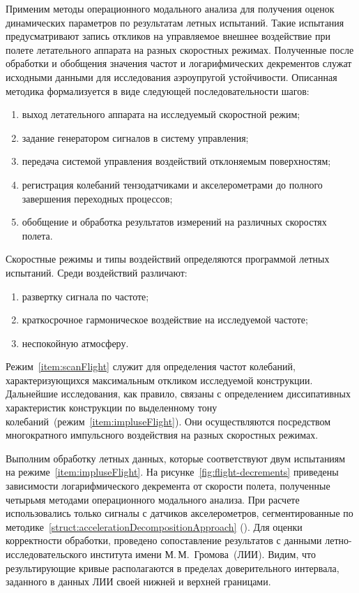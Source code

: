 Применим методы операционного модального анализа для получения оценок динамических параметров по результатам летных испытаний. Такие испытания предусматривают запись откликов на управляемое внешнее воздействие при полете летательного аппарата на разных скоростных режимах. Полученные после обработки и обобщения значения частот и логарифмических декрементов служат исходными данными для исследования аэроупругой устойчивости. Описанная методика формализуется в виде следующей последовательности шагов:
\begin{enumerate}
	\item выход летательного аппарата на исследуемый скоростной режим;
	\item задание генератором сигналов в систему управления; 
	\item передача системой управления воздействий отклоняемым поверхностям;
	\item регистрация колебаний тензодатчиками и акселерометрами до полного завершения переходных процессов;
	\item обобщение и обработка результатов измерений на различных скоростях полета.
\end{enumerate}

Скоростные режимы и типы воздействий определяются программой летных испытаний. Среди воздействий различают:
\begin{enumerate}
	\item развертку сигнала по частоте; \label{item:scanFlight}
	\item краткосрочное гармоническое воздействие на исследуемой частоте; \label{item:impluseFlight}
	\item неспокойную атмосферу.
\end{enumerate}

Режим~\ref{item:scanFlight} служит для определения частот колебаний, характеризующихся максимальным откликом исследуемой конструкции. Дальнейшие исследования, как правило, связаны с определением диссипативных характеристик конструкции по выделенному тону колебаний~(режим~\ref{item:impluseFlight}). Они осуществляются посредством многократного импульсного воздействия на разных скоростных режимах. 

Выполним обработку летных данных, которые соответствуют двум испытаниям на режиме~\ref{item:impluseFlight}. На рисунке~\ref{fig:flight-decrements} приведены зависимости логарифмического декремента от скорости полета, полученные четырьмя методами операционного модального анализа. При расчете использовались только сигналы с датчиков акселерометров, сегментированные по методике~\ref{struct:accelerationDecompositionApproach} (). Для оценки корректности обработки, проведено сопоставление результатов с данными летно-исследовательского института имени М.\,М.~Громова~(ЛИИ). Видим, что результирующие кривые располагаются в пределах доверительного интервала, заданного в данных ЛИИ своей нижней и верхней границами.

